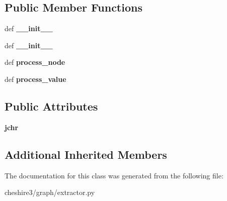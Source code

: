 \subsection*{Public Member Functions}
\begin{DoxyCompactItemize}
\item 
\hypertarget{classcheshire3_1_1graph_1_1extractor_1_1_rdf_extractor_aac5c661c54a5900ab9c36c376a79ffea}{def {\bfseries \-\_\-\-\_\-init\-\_\-\-\_\-}}\label{classcheshire3_1_1graph_1_1extractor_1_1_rdf_extractor_aac5c661c54a5900ab9c36c376a79ffea}

\item 
\hypertarget{classcheshire3_1_1graph_1_1extractor_1_1_rdf_extractor_aac5c661c54a5900ab9c36c376a79ffea}{def {\bfseries \-\_\-\-\_\-init\-\_\-\-\_\-}}\label{classcheshire3_1_1graph_1_1extractor_1_1_rdf_extractor_aac5c661c54a5900ab9c36c376a79ffea}

\item 
\hypertarget{classcheshire3_1_1graph_1_1extractor_1_1_rdf_extractor_aeb09c2259bbf42f66fbde44b05f562f7}{def {\bfseries process\-\_\-node}}\label{classcheshire3_1_1graph_1_1extractor_1_1_rdf_extractor_aeb09c2259bbf42f66fbde44b05f562f7}

\item 
\hypertarget{classcheshire3_1_1graph_1_1extractor_1_1_rdf_extractor_a58fd5bddcc012c44435e01af28717d65}{def {\bfseries process\-\_\-value}}\label{classcheshire3_1_1graph_1_1extractor_1_1_rdf_extractor_a58fd5bddcc012c44435e01af28717d65}

\end{DoxyCompactItemize}
\subsection*{Public Attributes}
\begin{DoxyCompactItemize}
\item 
\hypertarget{classcheshire3_1_1graph_1_1extractor_1_1_rdf_extractor_a8dc60e666d832729e8d32bce19ecd425}{{\bfseries jchr}}\label{classcheshire3_1_1graph_1_1extractor_1_1_rdf_extractor_a8dc60e666d832729e8d32bce19ecd425}

\end{DoxyCompactItemize}
\subsection*{Additional Inherited Members}


The documentation for this class was generated from the following file\-:\begin{DoxyCompactItemize}
\item 
cheshire3/graph/extractor.\-py\end{DoxyCompactItemize}
